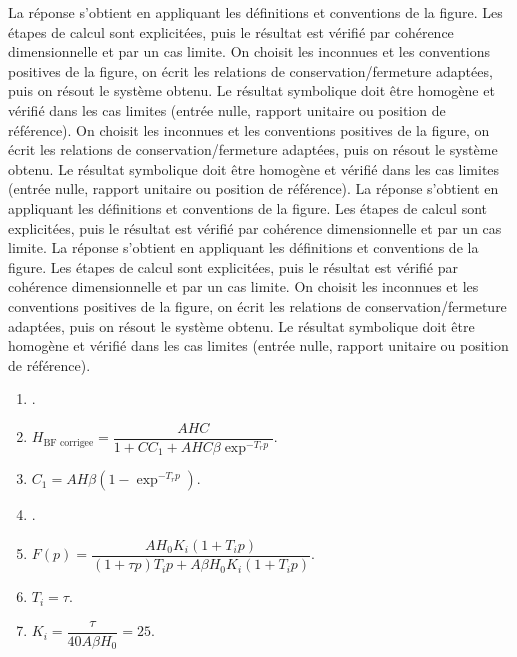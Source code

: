 \begin{corrigebox}
La réponse s'obtient en appliquant les définitions et conventions de la
    figure. Les étapes de calcul sont explicitées, puis le résultat est vérifié par
    cohérence dimensionnelle et par un cas limite.
On choisit les inconnues et les conventions positives de la figure,
        on écrit les relations de conservation/fermeture adaptées, puis on résout le
        système obtenu. Le résultat symbolique doit être homogène et vérifié dans les cas
        limites (entrée nulle, rapport unitaire ou position de référence).
On choisit les inconnues et les conventions positives de la figure,
        on écrit les relations de conservation/fermeture adaptées, puis on résout le
        système obtenu. Le résultat symbolique doit être homogène et vérifié dans les cas
        limites (entrée nulle, rapport unitaire ou position de référence).
La réponse s'obtient en appliquant les définitions et conventions de la
    figure. Les étapes de calcul sont explicitées, puis le résultat est vérifié par
    cohérence dimensionnelle et par un cas limite.
La réponse s'obtient en appliquant les définitions et conventions de la
    figure. Les étapes de calcul sont explicitées, puis le résultat est vérifié par
    cohérence dimensionnelle et par un cas limite.
On choisit les inconnues et les conventions positives de la figure,
        on écrit les relations de conservation/fermeture adaptées, puis on résout le
        système obtenu. Le résultat symbolique doit être homogène et vérifié dans les cas
        limites (entrée nulle, rapport unitaire ou position de référence).
\begin{enumerate}
\item .
\item $H_{\text{BF corrigee}} = \dfrac{AHC}{1+CC_1+AHC\beta \exp^{-T_r p}}$.
\item $C_1=AH\beta \left( 1- \exp^{-T_r p}\right)$.
\item .
\item $F(p)=\dfrac{AH_0K_i\left(1+T_i p\right)}{\left(1+\tau p\right)T_i p+A\beta H_0K_i \left(1+T_i p\right)}$.
\item $T_i = \tau$.
\item $K_i  = \dfrac{\tau }{40 A\beta H_0} = 25$.
\end{enumerate}
\end{corrigebox}
